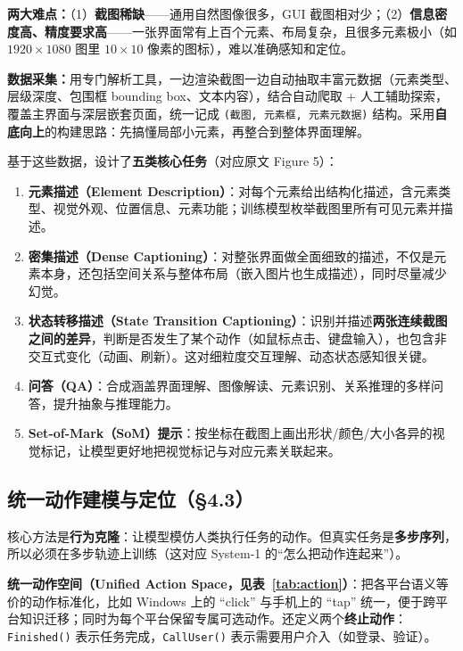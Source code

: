 \documentclass[11pt,UTF8,fontset=fandol]{ctexart}
\begin{document}
\textbf{两大难点：}（1）\textbf{截图稀缺}——通用自然图像很多，GUI 截图相对少；（2）\textbf{信息密度高、精度要求高}——一张界面常有上百个元素、布局复杂，且很多元素极小（如 $1920\times1080$ 图里 $10\times10$ 像素的图标），难以准确感知和定位。

\textbf{数据采集：}用专门解析工具，一边渲染截图一边自动抽取丰富元数据（元素类型、层级深度、包围框 bounding box、文本内容），结合自动爬取 + 人工辅助探索，覆盖主界面与深层嵌套页面，统一记成 \texttt{(截图, 元素框, 元素元数据)} 结构。采用\textbf{自底向上}的构建思路：先搞懂局部小元素，再整合到整体界面理解。

基于这些数据，设计了\textbf{五类核心任务}（对应原文 Figure 5）：
\begin{enumerate}[leftmargin=1.6em]
\item \textbf{元素描述（Element Description）}：对每个元素给出结构化描述，含元素类型、视觉外观、位置信息、元素功能；训练模型枚举截图里所有可见元素并描述。
\item \textbf{密集描述（Dense Captioning）}：对整张界面做全面细致的描述，不仅是元素本身，还包括空间关系与整体布局（嵌入图片也生成描述），同时尽量减少幻觉。
\item \textbf{状态转移描述（State Transition Captioning）}：识别并描述\textbf{两张连续截图之间的差异}，判断是否发生了某个动作（如鼠标点击、键盘输入），也包含非交互式变化（动画、刷新）。这对细粒度交互理解、动态状态感知很关键。
\item \textbf{问答（QA）}：合成涵盖界面理解、图像解读、元素识别、关系推理的多样问答，提升抽象与推理能力。
\item \textbf{Set-of-Mark（SoM）提示}：按坐标在截图上画出形状/颜色/大小各异的视觉标记，让模型更好地把视觉标记与对应元素关联起来。
\end{enumerate}

\subsection{统一动作建模与定位（§4.3）}

核心方法是\textbf{行为克隆}：让模型模仿人类执行任务的动作。但真实任务是\textbf{多步序列}，所以必须在多步轨迹上训练（这对应 System-1 的“怎么把动作连起来”）。

\textbf{统一动作空间（Unified Action Space，见表~\ref{tab:action}）}：把各平台语义等价的动作标准化，比如 Windows 上的 “click” 与手机上的 “tap” 统一，便于跨平台知识迁移；同时为每个平台保留专属可选动作。还定义两个\textbf{终止动作}：\texttt{Finished()} 表示任务完成，\texttt{CallUser()} 表示需要用户介入（如登录、验证）。
\end{document}
